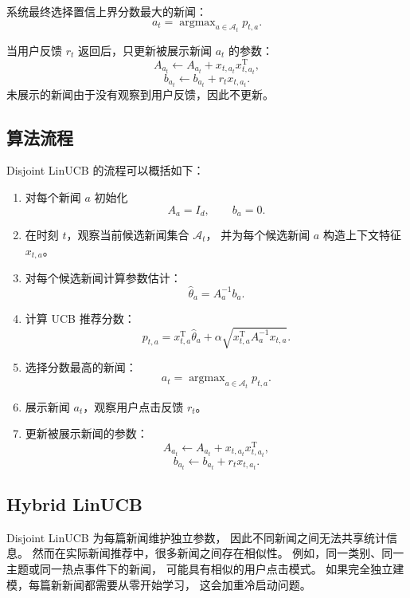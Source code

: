 \documentclass[11pt]{ctexart}
\begin{document}
系统最终选择置信上界分数最大的新闻：
\[
a_t
=
\mathop{\arg\max}_{a\in\mathcal{A}_t}
p_{t,a}.
\]

当用户反馈 $r_t$ 返回后，只更新被展示新闻 $a_t$ 的参数：
\[
A_{a_t}
\leftarrow
A_{a_t}
+
x_{t,a_t}x_{t,a_t}^{\mathrm{T}},
\]
\[
b_{a_t}
\leftarrow
b_{a_t}
+
r_t x_{t,a_t}.
\]
未展示的新闻由于没有观察到用户反馈，因此不更新。

\subsection{算法流程}

Disjoint LinUCB 的流程可以概括如下：

\begin{enumerate}
    \item 对每个新闻 $a$ 初始化
    \[
    A_a=I_d,\qquad b_a=0.
    \]

    \item 在时刻 $t$，观察当前候选新闻集合 $\mathcal{A}_t$，
    并为每个候选新闻 $a$ 构造上下文特征 $x_{t,a}$。

    \item 对每个候选新闻计算参数估计：
    \[
    \hat{\theta}_a=A_a^{-1}b_a.
    \]

    \item 计算 UCB 推荐分数：
    \[
    p_{t,a}
    =
    x_{t,a}^{\mathrm{T}}\hat{\theta}_a
    +
    \alpha
    \sqrt{
    x_{t,a}^{\mathrm{T}}A_a^{-1}x_{t,a}
    }.
    \]

    \item 选择分数最高的新闻：
    \[
    a_t=\mathop{\arg\max}_{a\in\mathcal{A}_t}p_{t,a}.
    \]

    \item 展示新闻 $a_t$，观察用户点击反馈 $r_t$。

    \item 更新被展示新闻的参数：
    \[
    A_{a_t}
    \leftarrow
    A_{a_t}
    +
    x_{t,a_t}x_{t,a_t}^{\mathrm{T}},
    \]
    \[
    b_{a_t}
    \leftarrow
    b_{a_t}
    +
    r_t x_{t,a_t}.
    \]
\end{enumerate}

\subsection{Hybrid LinUCB}

Disjoint LinUCB 为每篇新闻维护独立参数，
因此不同新闻之间无法共享统计信息。
然而在实际新闻推荐中，很多新闻之间存在相似性。
例如，同一类别、同一主题或同一热点事件下的新闻，
可能具有相似的用户点击模式。
如果完全独立建模，每篇新新闻都需要从零开始学习，
这会加重冷启动问题。
\end{document}
